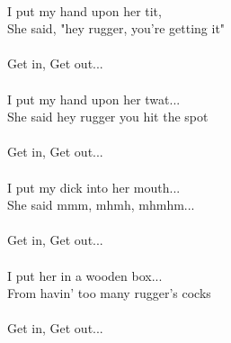 \hspace{10mm} \\
            I put my hand upon her tit,  \\
            She said, "hey rugger, you're getting it" \\
\hspace{10mm} \\
            Get in, Get out... \\
\hspace{10mm} \\
            I put my hand upon her twat...  \\
            She said hey rugger you hit the spot \\
\hspace{10mm} \\
            Get in, Get out... \\
\hspace{10mm} \\
            I put my dick into her mouth...  \\
            She said mmm, mhmh, mhmhm... \\
\hspace{10mm} \\
            Get in, Get out... \\
\hspace{10mm} \\
            I put her in a wooden box...  \\
            From havin' too many rugger's cocks \\
\hspace{10mm} \\
            Get in, Get out... \\

